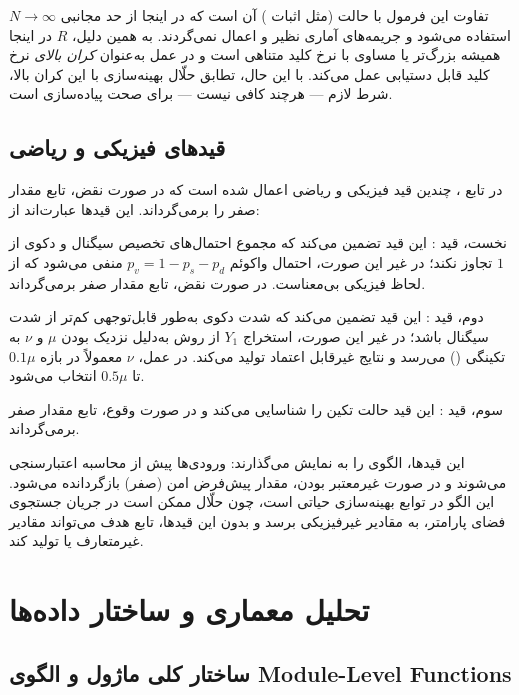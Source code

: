 تفاوت این فرمول با حالت  (مثل اثبات ) آن است که در اینجا از حد مجانبی $N \to \infty$ استفاده می‌شود و جریمه‌های آماری نظیر  و  اعمال نمی‌گردند. به همین دلیل، $R$ در اینجا همیشه بزرگ‌تر یا مساوی با نرخ کلید متناهی است و در عمل به‌عنوان \emph{کران بالای} نرخ کلید قابل دستیابی عمل می‌کند. با این حال، تطابق حلّال بهینه‌سازی با این کران بالا، شرط لازم — هرچند کافی نیست — برای صحت پیاده‌سازی است.

\subsection{قیدهای فیزیکی و ریاضی}

در تابع ، چندین قید فیزیکی و ریاضی اعمال شده است که در صورت نقض، تابع مقدار صفر را برمی‌گرداند. این قیدها عبارت‌اند از:

نخست، قید : این قید تضمین می‌کند که مجموع احتمال‌های تخصیص سیگنال و دکوی از $1$ تجاوز نکند؛ در غیر این صورت، احتمال واکوئم $p_v = 1 - p_s - p_d$ منفی می‌شود که از لحاظ فیزیکی بی‌معناست. در صورت نقض، تابع مقدار صفر برمی‌گرداند.

دوم، قید \lr{$\nu \geq 0.9 \cdot \mu$}: این قید تضمین می‌کند که شدت دکوی به‌طور قابل‌توجهی کم‌تر از شدت سیگنال باشد؛ در غیر این صورت، استخراج $Y_1$ از روش  به‌دلیل نزدیک بودن $\mu$ و $\nu$ به تکینگی () می‌رسد و نتایج غیرقابل اعتماد تولید می‌کند. در عمل، $\nu$ معمولاً در بازه $0.1 \mu$ تا $0.5 \mu$ انتخاب می‌شود.

سوم، قید : این قید حالت تکین را شناسایی می‌کند و در صورت وقوع، تابع مقدار صفر برمی‌گرداند.

این قیدها، الگوی  را به نمایش می‌گذارند: ورودی‌ها پیش از محاسبه اعتبارسنجی می‌شوند و در صورت غیرمعتبر بودن، مقدار پیش‌فرض امن (صفر) بازگردانده می‌شود. این الگو در توابع بهینه‌سازی حیاتی است، چون حلّال ممکن است در جریان جستجوی فضای پارامتر، به مقادیر غیرفیزیکی برسد و بدون این قیدها، تابع هدف می‌تواند مقادیر غیرمتعارف یا  تولید کند.

\section{تحلیل معماری و ساختار داده‌ها}

\subsection{ساختار کلی ماژول و الگوی Module-Level Functions}

